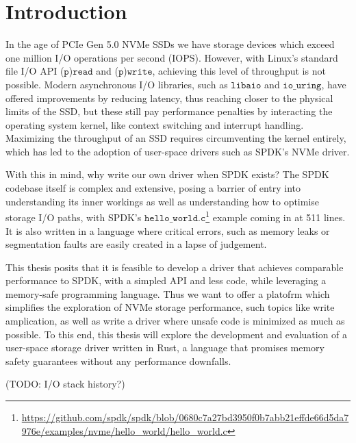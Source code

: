 \chapter{Introduction}\label{chapter:introduction}
In the age of PCIe Gen 5.0 NVMe SSDs we have storage devices which exceed one million I/O operations per second (IOPS). However, with Linux's standard file I/O API ($\texttt{p}$)$\texttt{read}$ and ($\texttt{p}$)$\texttt{write}$, achieving this level of throughput is not possible. Modern asynchronous I/O libraries, such as $\texttt{libaio}$ and $\texttt{io\_uring}$, have offered improvements by reducing latency, thus reaching closer to the physical limits of the SSD, but these still pay performance penalties by interacting the operating system kernel, like context switching and interrupt handling\cite{storage_api}. Maximizing the throughput of an SSD requires circumventing the kernel entirely, which has led to the adoption of user-space drivers such as SPDK's NVMe driver.

With this in mind, why write our own driver when SPDK exists? The SPDK codebase itself is complex and extensive, posing a barrier of entry into understanding its inner workings as well as understanding how to optimise storage I/O paths, with SPDK's $\texttt{hello\_world.c}$\footnote{\url{https://github.com/spdk/spdk/blob/0680c7a27bd3950f0b7abb21effde66d5da7976e/examples/nvme/hello_world/hello_world.c}} example coming in at 511 lines. It is also written in a language where critical errors, such as memory leaks or segmentation faults are easily created in a lapse of judgement.

This thesis posits that it is feasible to develop a driver that achieves comparable performance to SPDK, with a simpled API and less code, while leveraging a memory-safe programming language. Thus we want to offer a platofrm which simplifies the exploration of NVMe storage performance, such topics like write amplication, as well as write a driver where unsafe code is minimized as much as possible. To this end, this thesis will explore the development and evaluation of a user-space storage driver written in Rust, a language that promises memory safety guarantees without any performance downfalls.

(TODO: I/O stack history?)
